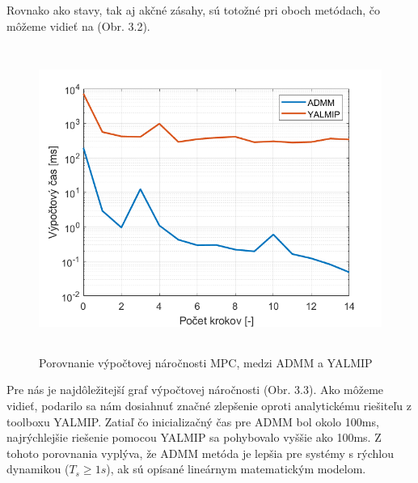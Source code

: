 Rovnako ako stavy, tak aj akčné zásahy, sú totožné pri oboch metódach, čo môžeme vidieť na (Obr. 3.2).
\newpage
\begin{figure}[H]
	\centering
	\includegraphics[width=13cm,height=10cm]{images/Hmotny_bod/Vypoctovy_cas}
	\caption{Porovnanie výpočtovej náročnosti MPC, medzi ADMM a YALMIP}
	\label{fig3: VNAA}
\end{figure}
Pre nás je najdôležitejší graf výpočtovej náročnosti (Obr. 3.3). Ako môžeme vidieť, podarilo sa nám dosiahnuť značné zlepšenie oproti analytickému riešiteľu z toolboxu YALMIP. Zatiaľ čo inicializačný čas pre ADMM bol okolo 100ms, najrýchlejšie riešenie pomocou YALMIP sa pohybovalo vyššie ako 100ms. Z tohoto porovnania vyplýva, že ADMM metóda je lepšia pre systémy s rýchlou dynamikou ($T_{s} \geq 1s $), ak sú opísané lineárnym matematickým modelom. 
\newpage